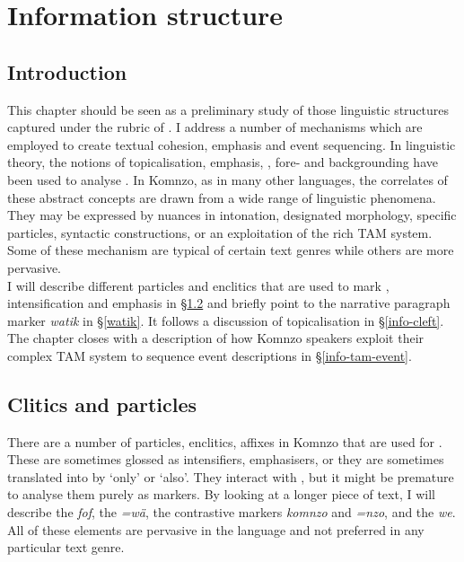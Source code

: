 
\chapter{Information structure} \label{cha:infostructure}

\section{Introduction} \label{intro-information-structure}

This chapter should be seen as a preliminary study of those linguistic structures captured under the rubric of . I address a number of mechanisms which are employed to create textual cohesion, emphasis and event sequencing. In linguistic theory, the notions of topicalisation, emphasis, , fore- and backgrounding have been used to analyse . In Komnzo, as in many other languages, the correlates of these abstract concepts are drawn from a wide range of linguistic phenomena. They may be expressed by nuances in intonation, designated morphology, specific particles, syntactic constructions, or an exploitation of the rich TAM system. Some of these mechanism are typical of certain text genres while others are more pervasive.\\

I will describe different particles and enclitics that are used to mark , intensification and emphasis in \S{}\ref{info-foc-emph} and briefly point to the narrative paragraph marker \emph{watik} in \S{}\ref{watik}. It follows a discussion of topicalisation in \S{}\ref{info-cleft}. The chapter closes with a description of how Komnzo speakers exploit their complex TAM system to sequence event descriptions in \S{}\ref{info-tam-event}.

\section{Clitics and particles} \label{info-foc-emph}

There are a number of particles, enclitics, affixes in Komnzo that are used for . These are sometimes glossed as intensifiers, emphasisers, or they are sometimes translated into  by `only' or `also'. They interact with , but it might be premature to analyse them purely as  markers. By looking at a longer piece of text, I will describe the  \emph{fof}, the   \emph{=wä}, the contrastive markers \emph{komnzo} and \emph{=nzo}, and the  \emph{we}. All of these elements are pervasive in the language and not preferred in any particular text genre.\\

